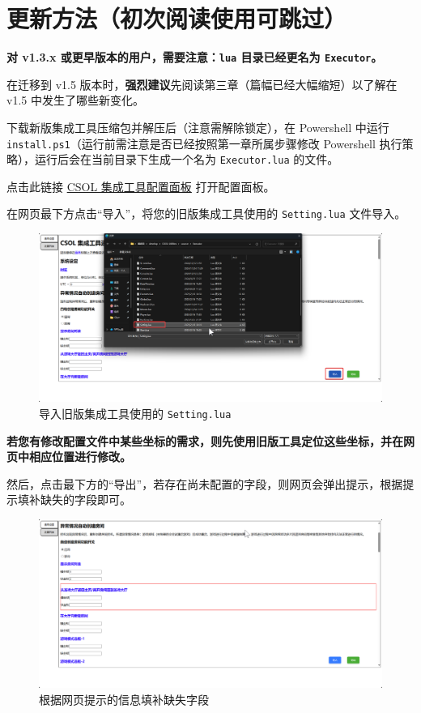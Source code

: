\section{更新方法（初次阅读使用可跳过）}
\label{how_to_update}

\textbf{\color{red}对 v1.3.x 或更早版本的用户，需要注意：\lstinline{lua} 目录已经更名为 \lstinline{Executor}。}

在迁移到 v1.5 版本时，\textbf{\color{red}强烈建议}先阅读第三章（篇幅已经大幅缩短）以了解在 v1.5 中发生了哪些新变化。

下载新版集成工具压缩包并解压后（注意需解除锁定），在 Powershell 中运行 \lstinline{install.ps1}（运行前需注意是否已经按照第一章所属步骤修改 Powershell 执行策略），运行后会在当前目录下生成一个名为 \lstinline{Executor.lua} 的文件。

点击此链接 \href{https://www.macrohard.fun/CSOL-Utilities/ConfigPanel}{CSOL 集成工具配置面板} 打开配置面板。

在网页最下方点击“导入”，将您的旧版集成工具使用的 \lstinline{Setting.lua} 文件导入。

\begin{figure}[H]
    \Centering
    \includegraphics[width=\textwidth]{assets/import_setting}
    \caption{导入旧版集成工具使用的 \lstinline{Setting.lua}}
\end{figure}

\textbf{\color{red}若您有修改配置文件中某些坐标的需求，则先使用旧版工具定位这些坐标，并在网页中相应位置进行修改。}

然后，点击最下方的“导出”，若存在尚未配置的字段，则网页会弹出提示，根据提示填补缺失的字段即可。

\begin{figure}[H]
    \Centering
    \includegraphics[width=\textwidth]{assets/export_error}
    \caption{根据网页提示的信息填补缺失字段}
\end{figure}

